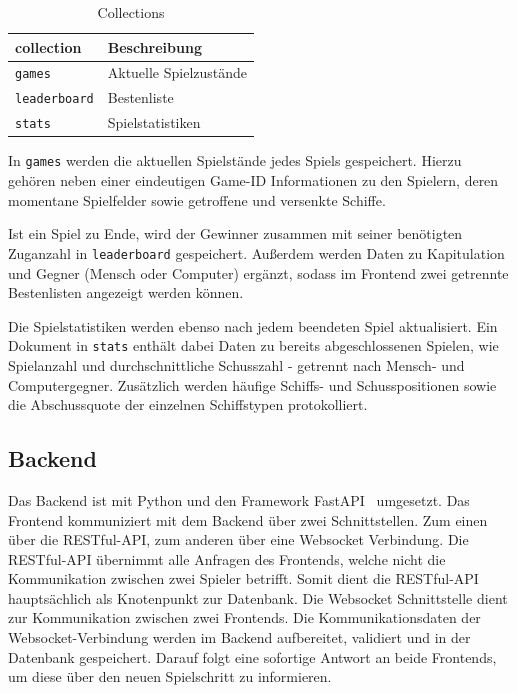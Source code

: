 \documentclass[a4paper, 10pt, conference]{IEEEtran}
\begin{document}
\begin{table}[h!]
    \begin{center}
        \caption{Collections}
        \label{tab:collections}
        \begin{tabular}{|l|l|}
            \textbf{collection} & \textbf{Beschreibung}\\
            \hline
            \texttt{games}				& Aktuelle Spielzustände\\
            \texttt{leaderboard}					& Bestenliste\\
            \texttt{stats}	& Spielstatistiken\\
        \end{tabular}
    \end{center}
\end{table}

In \texttt{games} werden die aktuellen Spielstände jedes Spiels gespeichert. Hierzu gehören neben einer eindeutigen Game-ID Informationen zu den Spielern, deren momentane Spielfelder sowie getroffene und versenkte Schiffe.

Ist ein Spiel zu Ende, wird der Gewinner zusammen mit seiner benötigten Zuganzahl in \texttt{leaderboard} gespeichert. Außerdem werden Daten zu Kapitulation und Gegner (Mensch oder Computer) ergänzt, sodass im Frontend zwei getrennte Bestenlisten angezeigt werden können.

Die Spielstatistiken werden ebenso nach jedem beendeten Spiel aktualisiert. Ein Dokument in \texttt{stats} enthält dabei Daten zu bereits abgeschlossenen Spielen, wie Spielanzahl und durchschnittliche Schusszahl - getrennt nach Mensch- und Computergegner. Zusätzlich werden häufige Schiffs- und Schusspositionen sowie die Abschussquote der einzelnen Schiffstypen protokolliert.

\subsection{Backend}\label{subsec:backend}
Das Backend ist mit Python und den Framework FastAPI~\cite{fastapi} umgesetzt. Das Frontend kommuniziert mit dem Backend über zwei Schnittstellen. Zum einen über die RESTful-API, zum anderen über eine Websocket Verbindung. Die RESTful-API übernimmt alle Anfragen des Frontends, welche nicht die Kommunikation zwischen zwei Spieler betrifft. Somit dient die RESTful-API hauptsächlich als Knotenpunkt zur Datenbank. Die Websocket Schnittstelle dient zur Kommunikation zwischen zwei Frontends. Die Kommunikationsdaten der Websocket-Verbindung werden im Backend aufbereitet, validiert und in der Datenbank gespeichert. Darauf folgt eine sofortige Antwort an beide Frontends, um diese über den neuen Spielschritt zu informieren.
\end{document}
